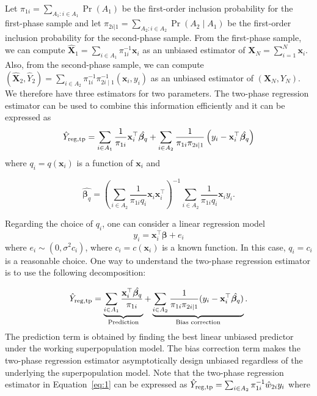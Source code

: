 \documentclass[12pt]{article}
\newcommand{\bx}{\mathbf{x}}
\renewcommand{\bf}[1]{\mathbf{#1}}
\begin{document}
Let $\pi_{1i} = \sum_{A_1: i \in A_1} \Pr(A_1)$ be the first-order inclusion
probability for the first-phase sample and let $\pi_{2i | 1} = \sum_{A_2: i \in
A_2} \Pr(A_2 \mid A_1)$ be the first-order inclusion probability for the
second-phase sample. From the first-phase sample, we can compute
$\widehat{\mathbf{X}}_1 = \sum_{i \in A_1} \pi_{1i}^{-1} \bx_i$ as an unbiased
estimator of $\mathbf{X}_N = \sum_{i=1}^N  \bx_i$. Also, from the second-phase
sample, we can compute $\left( \widehat{\mathbf{X}}_2 , \hat{Y}_2 \right) =
\sum_{i \in A_2} \pi_{1i}^{-1} \pi_{2i \mid 1}^{-1} \left( \bx_i, y_i\right)$ as
an unbiased estimator of $(\mathbf{X}_N, Y_N)$.
We therefore have three estimators for
two parameters. The two-phase regression estimator can be  used to combine this
information efficiently and it can be expressed as  
\begin{equation} \label{eq:1}
\hat Y_{\rm reg, tp} 
= \sum_{i \in A_1} \frac{1}{\pi_{1i}} \bf x_i^\top  \hat{\bm \beta_q} + 
\sum_{i \in A_2} \frac{1}{\pi_{1i}\pi_{2i|1}} \left(y_i - \bf x_i^\top  \hat{\bm \beta_q}\right)
\end{equation} 
where $q_i = q(\bf x_i)$  is a function of $\bf x_i$ and  

$$
\hat{\bm \beta_q} = \left(\sum_{i \in A_2} 
 \frac{1}{\pi_{1i} q_i } \bf x_i \bf x_i^\top \right)^{-1} 
\sum_{i \in A_2} \frac{1}{\pi_{1i} q_i} \bf x_i y_i .
$$ 

Regarding the choice of $q_i$, one can consider a linear regression model 
\begin{equation}
y_i = \bx_i^\top \bm \beta + e_i 
\label{regression}
\end{equation}
where $e_i \sim \left(0, \sigma^2 c_i \right)$, where $c_i=c( \bx_i)$ is a known
function. In this case,  $q_i = c_i$ is a reasonable choice. 
One way to understand the two-phase regression estimator is to use the following
decomposition: 

$$ 
\hat Y_{\rm reg, tp} 
= \underbrace{\sum_{i \in A_1} \frac{\bf x_i^\top \hat{\bm \beta_q}}{\pi_{1i}}}_{
  \text{ Prediction  }} + \underbrace{\sum_{i \in A_2}
\frac{1}{\pi_{1i}\pi_{2i|1}} (y_i - \bf x_i^\top \hat{\bm \beta_q})}_{
\text{Bias correction}}.
$$
The prediction term is obtained by finding the best linear unbiased predictor
under the working superpopulation model. The bias correction term 
makes the two-phase regression estimator asymptotically design unbiased
regardless of the underlying the superpopulation model. 
Note that the two-phase regression estimator in Equation~\ref{eq:1} can be
expressed as  $\hat Y_{\rm reg, tp} =
\sum_{i \in A_2} \pi_{1i}^{-1} \hat w_{2i} y_i$ where 
\end{document}
